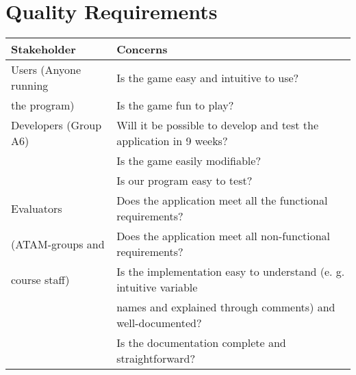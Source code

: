 \chapter{Quality Requirements}



  \begin{tabular}{ | l | l | }
    \hline
    Stakeholder & Concerns  \\ \hline
    Users (Anyone running &Is the game easy and intuitive to use? \\
    the program)&  Is the game fun to play? \\ \hline

    Developers (Group A6) & Will it be possible to develop and test the application in 9 weeks? \\ 
    & Is the game easily modifiable? \\
    & Is our program easy to test? \\ \hline

    Evaluators & Does the application meet all the functional requirements? \\
    (ATAM-groups and & Does the application meet all non-functional requirements? \\
    course staff) & Is the implementation easy to understand (e. g. intuitive variable \\
    & names and explained through comments) and well-documented? \\
    & Is the documentation complete and straightforward? \\ \hline

  \end{tabular}
